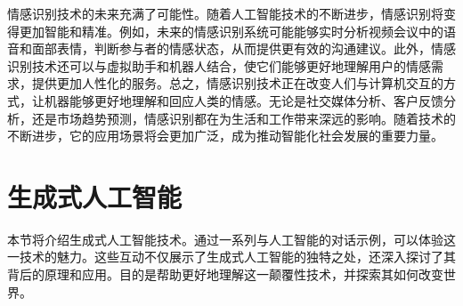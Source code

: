 情感识别技术的未来充满了可能性。随着人工智能技术的不断进步，情感识别将变得更加智能和精准。例如，未来的情感识别系统可能能够实时分析视频会议中的语音和面部表情，判断参与者的情感状态，从而提供更有效的沟通建议。此外，情感识别技术还可以与虚拟助手和机器人结合，使它们能够更好地理解用户的情感需求，提供更加人性化的服务。总之，情感识别技术正在改变人们与计算机交互的方式，让机器能够更好地理解和回应人类的情感。无论是社交媒体分析、客户反馈分析，还是市场趋势预测，情感识别都在为生活和工作带来深远的影响。随着技术的不断进步，它的应用场景将会更加广泛，成为推动智能化社会发展的重要力量。


\section{生成式人工智能}

本节将介绍生成式人工智能技术。通过一系列与人工智能的对话示例，可以体验这一技术的魅力。这些互动不仅展示了生成式人工智能的独特之处，还深入探讨了其背后的原理和应用。目的是帮助更好地理解这一颠覆性技术，并探索其如何改变世界。

